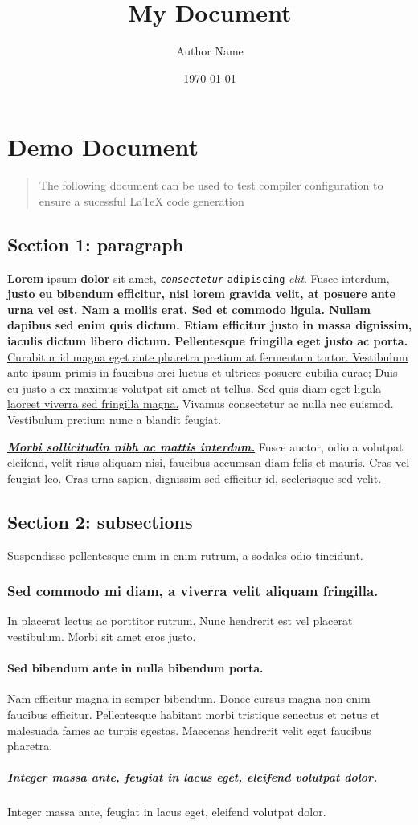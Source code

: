 \documentclass{article}
\title{My Document}\author{Author Name}\date{\today}
\begin{document}
\section*{Demo Document}\begin{quote}

The following document can be used to test compiler configuration to ensure a sucessful LaTeX code generation

\end{quote}

\subsection*{Section 1: paragraph}
\textbf{Lorem} ipsum \textbf{dolor} sit \underline{amet}, \texttt{\textit{consectetur}} \texttt{adipiscing} \textit{elit}. Fusce interdum, \textbf{justo eu bibendum efficitur, nisl lorem gravida velit, at posuere ante urna vel est. Nam a mollis erat. Sed et commodo ligula. Nullam dapibus sed enim quis dictum. Etiam efficitur justo in massa dignissim, iaculis dictum libero dictum. Pellentesque fringilla eget justo ac porta.} \underline{Curabitur id magna eget ante pharetra pretium at fermentum tortor. Vestibulum ante ipsum primis in faucibus orci luctus et ultrices posuere cubilia curae; Duis eu justo a ex maximus volutpat sit amet at tellus. Sed quis diam eget ligula laoreet viverra sed fringilla magna.} Vivamus consectetur ac nulla nec euismod. Vestibulum pretium nunc a blandit feugiat.

\underline{\textbf{\textit{Morbi sollicitudin nibh ac mattis interdum.}}} Fusce auctor, odio a volutpat eleifend, velit risus aliquam nisi, faucibus accumsan diam felis et mauris. Cras vel feugiat leo. Cras urna sapien, dignissim sed efficitur id, scelerisque sed velit. 


\subsection*{Section 2: subsections}
Suspendisse pellentesque enim in enim rutrum, a sodales odio tincidunt. 
\subsubsection*{Sed commodo mi diam, a viverra velit aliquam fringilla. }
In placerat lectus ac porttitor rutrum. Nunc hendrerit est vel placerat vestibulum. Morbi sit amet eros justo. 
\paragraph{Sed bibendum ante in nulla bibendum porta. }
Nam efficitur magna in semper bibendum. Donec cursus magna non enim faucibus efficitur. Pellentesque habitant morbi tristique senectus et netus et malesuada fames ac turpis egestas. Maecenas hendrerit velit eget faucibus pharetra.
\subparagraph{Integer massa ante, feugiat in lacus eget, eleifend volutpat dolor.}
Integer massa ante, feugiat in lacus eget, eleifend volutpat dolor. 
\end{document}

